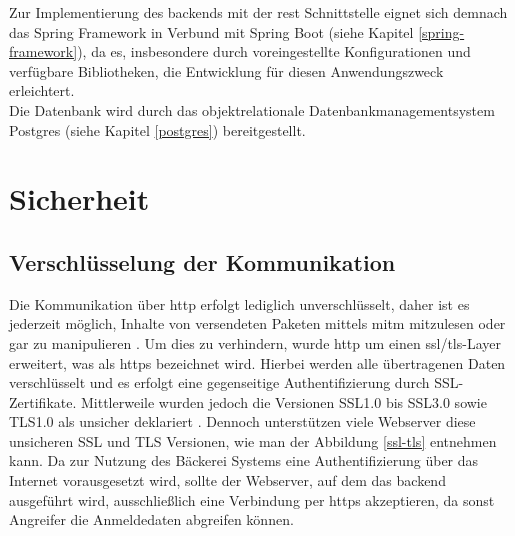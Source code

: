 Zur Implementierung des \gls{backend}s mit der \gls{rest} Schnittstelle eignet sich demnach das Spring Framework in Verbund mit Spring Boot (siehe Kapitel \ref{spring-framework}), da es, insbesondere durch voreingestellte Konfigurationen und verfügbare Bibliotheken, die Entwicklung für diesen Anwendungszweck erleichtert.
\\
Die Datenbank wird durch das objektrelationale Datenbankmanagementsystem Postgres (siehe Kapitel \ref{postgres}) bereitgestellt.

\clearpage

\section{Sicherheit}

\subsection{Verschlüsselung der Kommunikation}
Die Kommunikation über \gls{http} erfolgt lediglich unverschlüsselt, daher ist es jederzeit möglich, Inhalte von versendeten Paketen mittels \gls{mitm} mitzulesen oder gar zu manipulieren  \cite[S.~9]{websecurity-book}.
Um dies zu verhindern, wurde \gls{http} um einen \gls{ssl}/\gls{tls}-Layer erweitert, was als \gls{https} bezeichnet wird.
Hierbei werden alle übertragenen Daten verschlüsselt und es erfolgt eine gegenseitige Authentifizierung durch SSL-Zertifikate.
Mittlerweile wurden jedoch die Versionen SSL1.0 bis SSL3.0 sowie TLS1.0 als unsicher deklariert \cite{ssl}.
Dennoch unterstützen viele Webserver diese unsicheren SSL und TLS Versionen, wie man der Abbildung \ref{ssl-tls} entnehmen kann.
Da zur Nutzung des Bäckerei Systems eine Authentifizierung über das Internet vorausgesetzt wird, sollte der Webserver, auf dem das \gls{backend} ausgeführt wird, ausschließlich eine Verbindung per \gls{https} akzeptieren, da sonst Angreifer die Anmeldedaten abgreifen können.


\clearpage

